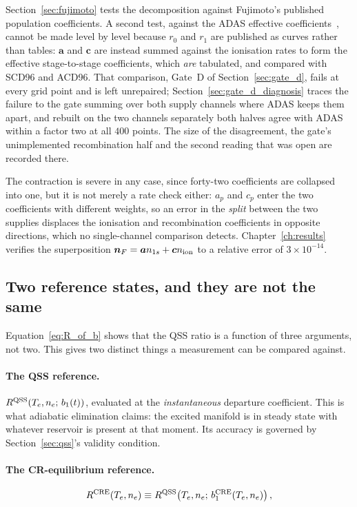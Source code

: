 Section~\ref{sec:fujimoto} tests the decomposition against Fujimoto's published
population coefficients. A second test, against the ADAS effective
coefficients~\cite{Summers2006}, cannot be made level by level because $r_0$
and $r_1$ are published as curves rather than tables: $\bm{a}$ and $\bm{c}$ are
instead summed against the ionisation rates to form the effective
stage-to-stage coefficients, which \emph{are} tabulated, and compared with
SCD96 and ACD96. That comparison, Gate~D of Section~\ref{sec:gate_d}, fails at
every grid point and is left unrepaired; Section~\ref{sec:gate_d_diagnosis}
traces the failure to the gate summing over both supply channels where ADAS
keeps them apart, and rebuilt on the two channels separately both halves agree
with ADAS within a factor two at all $400$ points. The size of the
disagreement, the gate's unimplemented recombination half and the second
reading that was open are recorded there.

The contraction is severe in any case, since forty-two coefficients are
collapsed into one, but it is not merely a rate check either:
$a_p$ and $c_p$ enter the two coefficients with different weights, so an
error in the \emph{split} between the two supplies displaces the ionisation and
recombination coefficients in opposite directions, which no single-channel
comparison detects. Chapter~\ref{ch:results} verifies the superposition
$\bm{n}_{F} = \bm{a}n_{1s} + \bm{c}n_{\mathrm{ion}}$ to a relative error of
$3\times10^{-14}$.

\subsection{Two reference states, and they are not the same}

Equation~\eqref{eq:R_of_b} shows that the QSS ratio is a function of three
arguments, not two. This gives two distinct things a measurement can be compared
against.

\paragraph{The QSS reference.} $R^{\mathrm{QSS}}(T_e, n_e;\,b_1(t))$, evaluated at the
\emph{instantaneous} departure coefficient. This is what adiabatic elimination
claims: the excited manifold is in steady state with whatever reservoir is
present at that moment. Its accuracy is governed by
Section~\ref{sec:qss}'s validity condition.

\paragraph{The CR-equilibrium reference.}
\begin{equation}
  R^{\mathrm{CRE}}(T_e, n_e)
  \equiv R^{\mathrm{QSS}}\!\left(T_e, n_e;\,b_1^{\mathrm{CRE}}(T_e,n_e)\right),
  \label{eq:cre_ratio}
\end{equation}

